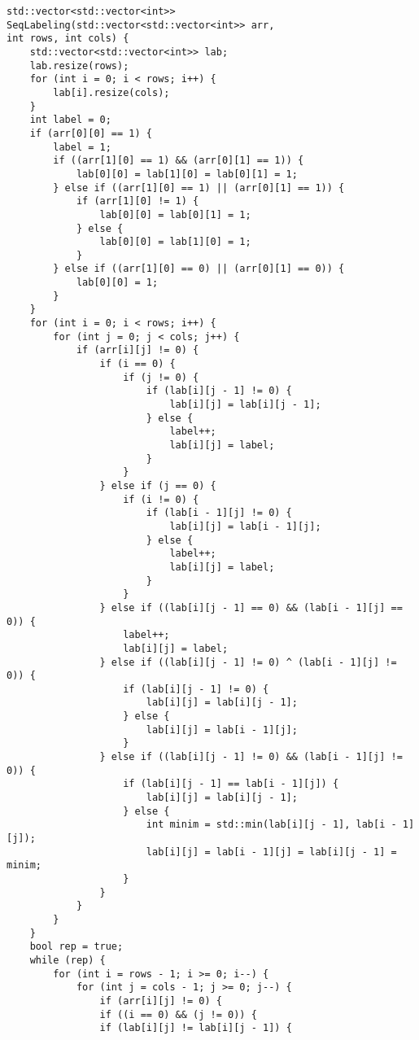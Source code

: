 \documentclass{report}
\begin{document}
\begin{lstlisting}
std::vector<std::vector<int>> SeqLabeling(std::vector<std::vector<int>> arr,
int rows, int cols) {
    std::vector<std::vector<int>> lab;
    lab.resize(rows);
    for (int i = 0; i < rows; i++) {
        lab[i].resize(cols);
    }
    int label = 0;
    if (arr[0][0] == 1) {
        label = 1;
        if ((arr[1][0] == 1) && (arr[0][1] == 1)) {
            lab[0][0] = lab[1][0] = lab[0][1] = 1;
        } else if ((arr[1][0] == 1) || (arr[0][1] == 1)) {
            if (arr[1][0] != 1) {
                lab[0][0] = lab[0][1] = 1;
            } else {
                lab[0][0] = lab[1][0] = 1;
            }
        } else if ((arr[1][0] == 0) || (arr[0][1] == 0)) {
            lab[0][0] = 1;
        }
    }
    for (int i = 0; i < rows; i++) {
        for (int j = 0; j < cols; j++) {
            if (arr[i][j] != 0) {
                if (i == 0) {
                    if (j != 0) {
                        if (lab[i][j - 1] != 0) {
                            lab[i][j] = lab[i][j - 1];
                        } else {
                            label++;
                            lab[i][j] = label;
                        }
                    }
                } else if (j == 0) {
                    if (i != 0) {
                        if (lab[i - 1][j] != 0) {
                            lab[i][j] = lab[i - 1][j];
                        } else {
                            label++;
                            lab[i][j] = label;
                        }
                    }
                } else if ((lab[i][j - 1] == 0) && (lab[i - 1][j] == 0)) {
                    label++;
                    lab[i][j] = label;
                } else if ((lab[i][j - 1] != 0) ^ (lab[i - 1][j] != 0)) {
                    if (lab[i][j - 1] != 0) {
                        lab[i][j] = lab[i][j - 1];
                    } else {
                        lab[i][j] = lab[i - 1][j];
                    }
                } else if ((lab[i][j - 1] != 0) && (lab[i - 1][j] != 0)) {
                    if (lab[i][j - 1] == lab[i - 1][j]) {
                        lab[i][j] = lab[i][j - 1];
                    } else {
                        int minim = std::min(lab[i][j - 1], lab[i - 1][j]);
                        lab[i][j] = lab[i - 1][j] = lab[i][j - 1] = minim;
                    }
                }
            }
        }
    }
    bool rep = true;
    while (rep) {
        for (int i = rows - 1; i >= 0; i--) {
            for (int j = cols - 1; j >= 0; j--) {
                if (arr[i][j] != 0) {
                if ((i == 0) && (j != 0)) {
                if (lab[i][j] != lab[i][j - 1]) {

\end{lstlisting}
\end{document}
